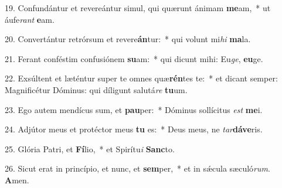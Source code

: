 19. Confundántur et revereántur simul, qui quærunt ánimam \textbf{me}am,~*  ut áufe\textit{rant} \textbf{e}am.\

20. Convertántur retrórsum et revere\textbf{án}tur:~*  qui volunt mi\textit{hi} \textbf{ma}la.\

21. Ferant conféstim confusiónem \textbf{su}am:~*  qui dicunt mihi: Eu\textit{ge}, \textbf{eu}ge.\

22. Exsúltent et læténtur super te omnes quæ\textbf{rén}tes te:~*  et dicant semper: Magnificétur Dóminus: qui díligunt salutá\textit{re} \textbf{tu}um.\

23. Ego autem mendícus sum, et \textbf{pau}per:~*  Dóminus sollícitus \textit{est} \textbf{me}i.\

24. Adjútor meus et protéctor meus \textbf{tu} es:~*  Deus meus, ne \textit{tar}\textbf{dá}\textbf{ve}ris.\

25. Glória Patri, et \textbf{Fí}lio,~*  et Spirítu\textit{i} \textbf{Sanc}to.\

26. Sicut erat in princípio, et nunc, et \textbf{sem}per,~*  et in sǽcula sæculó\textit{rum}. \textbf{A}men.\

